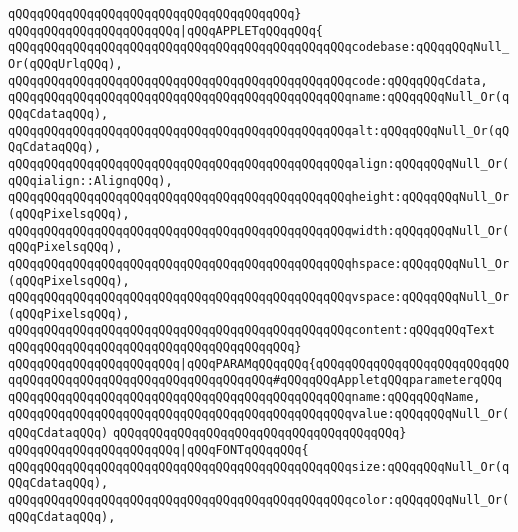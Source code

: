\verb|qQQqqQQqqQQqqQQqqQQqqQQqqQQqqQQqqQQqqQQq}|\newline
\verb|qQQqqQQqqQQqqQQqqQQqqQQq|\verb#|qQQqAPPLETqQQqqQQq{#\newline
\verb|qQQqqQQqqQQqqQQqqQQqqQQqqQQqqQQqqQQqqQQqqQQqqQQqcodebase:qQQqqQQqNull_Or(qQQqUrlqQQq),|\newline
\verb|qQQqqQQqqQQqqQQqqQQqqQQqqQQqqQQqqQQqqQQqqQQqqQQqcode:qQQqqQQqCdata,|\newline
\verb|qQQqqQQqqQQqqQQqqQQqqQQqqQQqqQQqqQQqqQQqqQQqqQQqname:qQQqqQQqNull_Or(qQQqCdataqQQq),|\newline
\verb|qQQqqQQqqQQqqQQqqQQqqQQqqQQqqQQqqQQqqQQqqQQqqQQqalt:qQQqqQQqNull_Or(qQQqCdataqQQq),|\newline
\verb|qQQqqQQqqQQqqQQqqQQqqQQqqQQqqQQqqQQqqQQqqQQqqQQqalign:qQQqqQQqNull_Or(qQQqialign::AlignqQQq),|\newline
\verb|qQQqqQQqqQQqqQQqqQQqqQQqqQQqqQQqqQQqqQQqqQQqqQQqheight:qQQqqQQqNull_Or(qQQqPixelsqQQq),|\newline
\verb|qQQqqQQqqQQqqQQqqQQqqQQqqQQqqQQqqQQqqQQqqQQqqQQqwidth:qQQqqQQqNull_Or(qQQqPixelsqQQq),|\newline
\verb|qQQqqQQqqQQqqQQqqQQqqQQqqQQqqQQqqQQqqQQqqQQqqQQqhspace:qQQqqQQqNull_Or(qQQqPixelsqQQq),|\newline
\verb|qQQqqQQqqQQqqQQqqQQqqQQqqQQqqQQqqQQqqQQqqQQqqQQqvspace:qQQqqQQqNull_Or(qQQqPixelsqQQq),|\newline
\verb|qQQqqQQqqQQqqQQqqQQqqQQqqQQqqQQqqQQqqQQqqQQqqQQqcontent:qQQqqQQqText|\newline
\verb|qQQqqQQqqQQqqQQqqQQqqQQqqQQqqQQqqQQqqQQq}|\newline
\verb|qQQqqQQqqQQqqQQqqQQqqQQq|\verb#|qQQqPARAMqQQqqQQq{qQQqqQQqqQQqqQQqqQQqqQQqqQQqqQQqqQQqqQQqqQQqqQQqqQQqqQQqqQQqqQQq#\verb|#qQQqqQQqAppletqQQqparameterqQQq|\newline
\verb|qQQqqQQqqQQqqQQqqQQqqQQqqQQqqQQqqQQqqQQqqQQqqQQqname:qQQqqQQqName,|\newline
\verb|qQQqqQQqqQQqqQQqqQQqqQQqqQQqqQQqqQQqqQQqqQQqqQQqvalue:qQQqqQQqNull_Or(qQQqCdataqQQq)|\newline
\verb|qQQqqQQqqQQqqQQqqQQqqQQqqQQqqQQqqQQqqQQq}|\newline
\verb|qQQqqQQqqQQqqQQqqQQqqQQq|\verb#|qQQqFONTqQQqqQQq{#\newline
\verb|qQQqqQQqqQQqqQQqqQQqqQQqqQQqqQQqqQQqqQQqqQQqqQQqsize:qQQqqQQqNull_Or(qQQqCdataqQQq),|\newline
\verb|qQQqqQQqqQQqqQQqqQQqqQQqqQQqqQQqqQQqqQQqqQQqqQQqcolor:qQQqqQQqNull_Or(qQQqCdataqQQq),|\newline
